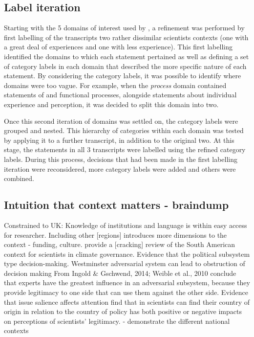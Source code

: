 \subsection{Label iteration}
Starting with the 5 domains of interest used by \textcite{HaynesDCRHGS2011}, a refinement was performed by first labelling of the transcripts two rather dissimilar scientists contexts (one with a great deal of experiences and one with less experience). This first labelling identified the domains to which each statement pertained as well as defining a set of category labels in each domain that described the more specific nature of each statement. By considering the category labels, it was possible to identify where domains were too vague. For example, when the \emph{process} domain contained statements of and functional processes, alongside statements about individual experience and perception, it was decided to split this domain into two.

Once this second iteration of domains was settled on, the category labels were grouped and nested. This hierarchy of categories within each domain was tested by applying it to a further transcript, in addition to the original two. At this stage, the statements in all 3 transcripts were labelled using the refined category labels. During this process, decisions that had been made in the first labelling iteration were reconsidered, more category labels were added and others were combined.

\subsection{Intuition that context matters - braindump}
Constrained to UK: Knowledge of institutions and language is within easy access for researcher. Including other [regions] introduces more dimensions to the context - funding, culture. \textcite{IbarraJOBCIMRS2022} provide a [cracking] review of the South American context for scientists in climate governance. Evidence that the political subsystem type decision-making. Westminster adversarial system can lead to obstruction of decision making \cite{PierreP2020} From \textcite{SaxonbergSL2023} Ingold \& Gschwend, 2014; Weible et al., 2010 conclude that experts have the greatest influence in an adversarial subsystem, because they provide legitimacy to one side that can use them against the other side. Evidence that issue salience affects attention \cite{OjanenBKP2021} find that in scientists can find their country of origin in relation to the country of policy has both positive or negative impacts on perceptions of scientists' legitimacy. \cite{StrassheimK2014} - demonstrate the different national contexts

